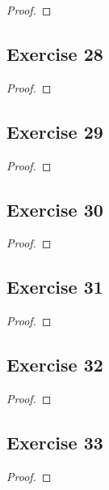 \documentclass[14pt]{extarticle}
\begin{document}
\begin{proof}

\end{proof}

\subsection{Exercise 28}

\begin{proof}

\end{proof}

\subsection{Exercise 29}

\begin{proof}

\end{proof}

\subsection{Exercise 30}

\begin{proof}

\end{proof}

\subsection{Exercise 31}

\begin{proof}

\end{proof}

\subsection{Exercise 32}

\begin{proof}

\end{proof}

\subsection{Exercise 33}

\begin{proof}

\end{proof}
\end{document}
